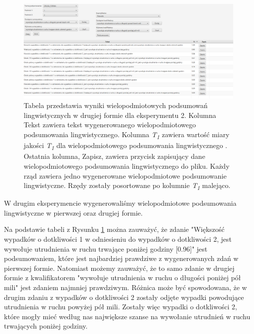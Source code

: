 \documentclass{classrep}
\begin{document}
\begin{figure}[h!]
\centering
\includegraphics[width=15cm]{ex_wiel2.png}
\vspace{-0.3cm}
\caption{Tabela przedstawia wyniki wielopodmiotowych podsumowań lingwistycznych w drugiej formie dla eksperymentu 2. Kolumna Tekst zawiera tekst wygenerowanego wielopodmiotowego podsumowania lingwistycznego. Kolumna \textit{T\textsubscript{1}} zawiera wartość miary jakości \textit{T\textsubscript{1}} dla wielopodmiotowego podsumowania lingwistycznego \cite{niewiadomski19}. Ostatnia kolumna, Zapisz, zawiera przycisk zapisujący dane wielopodmiotowego podsumowania lingwistycznego do pliku. Każdy rząd zawiera jedno wygenerowane wielopodmiotowe podsumowanie lingwistyczne. Rzędy zostały posortowane po kolumnie \textit{T\textsubscript{1}} malejąco. }
\label{wykr_ex_wiel2}
\end{figure}

W drugim eksperymencie wygenerowaliśmy wielopodmiotowe podsumowania lingwistyczne w pierwszej oraz drugiej formie.

Na podstawie tabeli z Rysunku \ref{wykr_ex_wiel2} można zauważyć, że zdanie "Większość wypadków o dotkliwości 1 w odniesieniu do wypadków o dotkliwości 2, jest wywołuje utrudnienia w ruchu trwające poniżej godziny [0.96]" jest podsumowaniem, które jest najbardziej prawdziwe z wygenerowanych zdań w pierwszej formie. Natomiast możemy zauważyć, że to samo zdanie w drugiej formie z kwalifikatorem "wywołuje utrudnienia w ruchu o długości poniżej pół mili" jest zdaniem najmniej prawdziwym. Różnica może być spowodowana, że w drugim zdaniu z wypadków o dotkliwości 2 zostały odjęte wypadki powodujące utrudnienia w ruchu powyżej pół mili. Zostały więc wypadki o dotkliwości 2, które mogły mieć według nas największe szanse na wywołanie utrudnień w ruchu trwających poniżej godziny.

\newpage
\end{document}
